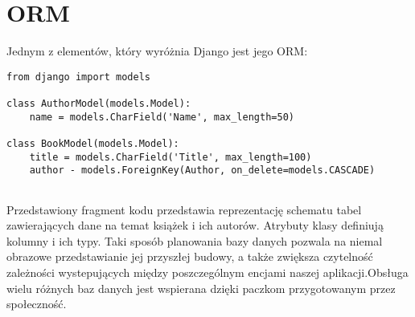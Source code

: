 \section{ORM}
Jednym z elementów, który wyróżnia Django jest jego ORM:
\begin{lstlisting}
from django import models

class AuthorModel(models.Model):
	name = models.CharField('Name', max_length=50)

class BookModel(models.Model):
	title = models.CharField('Title', max_length=100)
	author - models.ForeignKey(Author, on_delete=models.CASCADE)
	
\end{lstlisting}

Przedstawiony fragment kodu przedstawia reprezentację schematu tabel zawierających dane na temat książek i ich autorów. Atrybuty klasy definiują kolumny i ich typy. 
Taki sposób planowania bazy danych pozwala na niemal obrazowe przedstawianie jej przyszłej budowy, a także zwiększa czytelność zależności wystepujących między poszczególnym encjami naszej aplikacji.Obsługa wielu różnych baz danych jest wspierana dzięki paczkom przygotowanym przez społeczność. 